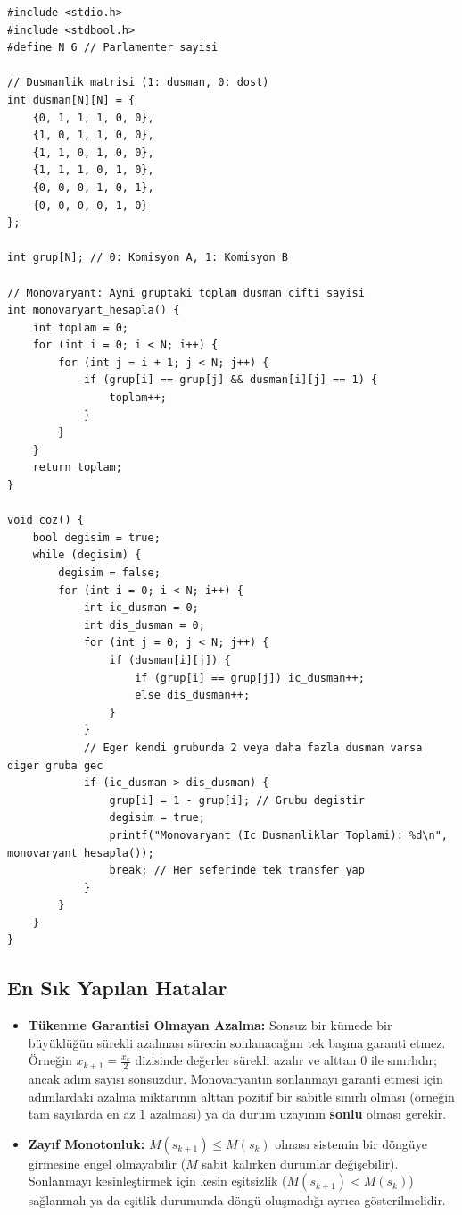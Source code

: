 \begin{lstlisting}[language=CTemel]
#include <stdio.h>
#include <stdbool.h>
#define N 6 // Parlamenter sayisi

// Dusmanlik matrisi (1: dusman, 0: dost)
int dusman[N][N] = {
    {0, 1, 1, 1, 0, 0},
    {1, 0, 1, 1, 0, 0},
    {1, 1, 0, 1, 0, 0},
    {1, 1, 1, 0, 1, 0},
    {0, 0, 0, 1, 0, 1},
    {0, 0, 0, 0, 1, 0}
};

int grup[N]; // 0: Komisyon A, 1: Komisyon B

// Monovaryant: Ayni gruptaki toplam dusman cifti sayisi
int monovaryant_hesapla() {
    int toplam = 0;
    for (int i = 0; i < N; i++) {
        for (int j = i + 1; j < N; j++) {
            if (grup[i] == grup[j] && dusman[i][j] == 1) {
                toplam++;
            }
        }
    }
    return toplam;
}

void coz() {
    bool degisim = true;
    while (degisim) {
        degisim = false;
        for (int i = 0; i < N; i++) {
            int ic_dusman = 0;
            int dis_dusman = 0;
            for (int j = 0; j < N; j++) {
                if (dusman[i][j]) {
                    if (grup[i] == grup[j]) ic_dusman++;
                    else dis_dusman++;
                }
            }
            // Eger kendi grubunda 2 veya daha fazla dusman varsa diger gruba gec
            if (ic_dusman > dis_dusman) {
                grup[i] = 1 - grup[i]; // Grubu degistir
                degisim = true;
                printf("Monovaryant (Ic Dusmanliklar Toplami): %d\n", monovaryant_hesapla());
                break; // Her seferinde tek transfer yap
            }
        }
    }
}
\end{lstlisting}

\subsection{En Sık Yapılan Hatalar}
\begin{itemize}
    \item \textbf{Tükenme Garantisi Olmayan Azalma:} Sonsuz bir kümede bir büyüklüğün sürekli azalması sürecin sonlanacağını tek başına garanti etmez. Örneğin $x_{k+1} = \frac{x_k}{2}$ dizisinde değerler sürekli azalır ve alttan 0 ile sınırlıdır; ancak adım sayısı sonsuzdur. Monovaryantın sonlanmayı garanti etmesi için adımlardaki azalma miktarının alttan pozitif bir sabitle sınırlı olması (örneğin tam sayılarda en az $1$ azalması) ya da durum uzayının \textbf{sonlu} olması gerekir.
    \item \textbf{Zayıf Monotonluk:} $M(s_{k+1}) \le M(s_k)$ olması sistemin bir döngüye girmesine engel olmayabilir ($M$ sabit kalırken durumlar değişebilir). Sonlanmayı kesinleştirmek için kesin eşitsizlik ($M(s_{k+1}) < M(s_k)$) sağlanmalı ya da eşitlik durumunda döngü oluşmadığı ayrıca gösterilmelidir.
\end{itemize}

